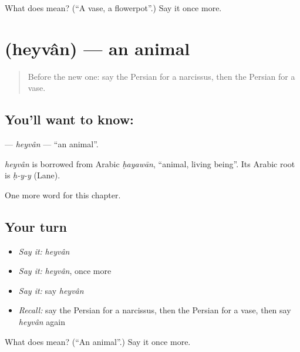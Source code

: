 \begin{tcolorbox}[breakable,colback=teal!4,colframe=teal!35!black,title={Before you move on}]
What does  mean? (\textquotedblleft{}A vase, a flowerpot\textquotedblright{}.) Say it once more.
\end{tcolorbox}
\section[\texorpdfstring{\fa{حیوان} (heyvân)}{حیوان (heyvân)}]{ (heyvân) — an animal}

\label{lesson:FA-C171-heyvan}



\begin{quote}
Before the new one: say the Persian for a narcissus, then the Persian for a vase.
\end{quote}

\subsection*{You'll want to know: }
\textbf{} — \emph{heyvân} — \textquotedblleft{}an animal\textquotedblright{}.

\begin{cousinweb}
\emph{heyvân} is borrowed from Arabic \emph{ḥayawān}, \textquotedblleft{}animal, living being\textquotedblright{}. Its Arabic root is \emph{ḥ-y-y} (Lane).
\end{cousinweb}

\begin{grammarlens}[title={What you've built}]
One more word for this chapter.
\end{grammarlens}

\subsection*{Your turn}
\begin{itemize}
\raggedright
  \item \emph{Say it:} \emph{heyvân}
  \item \emph{Say it:} \emph{heyvân}, once more
  \item \emph{Say it:} say \emph{heyvân}
  \item \emph{Recall:} say the Persian for a narcissus, then the Persian for a vase, then say \emph{heyvân} again
\end{itemize}

\begin{tcolorbox}[breakable,colback=teal!4,colframe=teal!35!black,title={Before you move on}]
What does  mean? (\textquotedblleft{}An animal\textquotedblright{}.) Say it once more.
\end{tcolorbox}
